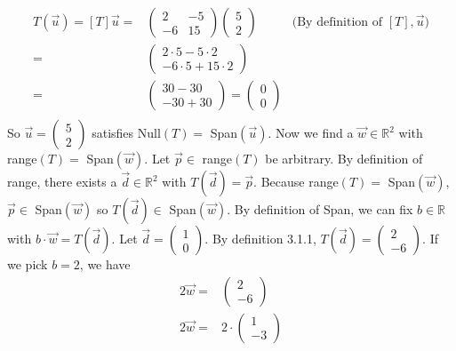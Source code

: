 \documentclass[12pt]{article}
\newenvironment{problem}[2][Problem]
{
	\begin{trivlist} 
		\item[\hskip \labelsep {\bfseries #1 #2:}]
	}
{
	\end{trivlist}
	}
\newenvironment{solution}[1][Solution]
{
	\begin{trivlist} 
		\item[\hskip \labelsep {\itshape #1:}]
	}
	{
	\end{trivlist}
}
\begin{document}
\begin{problem}{1}
\begin{solution}
\begin{align*}
T(\vec{u})=[T]\vec{u}=&\begin{pmatrix}2 &-5\\-6 & 15 \end{pmatrix}\begin{pmatrix}5\\2 \end{pmatrix} & \text{(By definition of $[T], \vec{u}$)}\\
=& \begin{pmatrix} 2\cdot 5-5\cdot 2\\-6\cdot 5+15\cdot 2 \end{pmatrix} &\\
=& \begin{pmatrix}30-30\\-30 + 30\end{pmatrix} = \begin{pmatrix} 0\\0 \end{pmatrix} &\\
\end{align*}
So $\vec{u}=\begin{pmatrix} 5\\2 \end{pmatrix}$ satisfies Null$(T)=$ Span$(\vec{u})$.
\newline
\newline
Now we find a $\vec{w} \in \mathbb{R}^2$ with range$(T)=$ Span$(\vec{w})$. Let $\vec{p} \in$ range$(T)$ be arbitrary. By definition of range, there exists a $\vec{d} \in \mathbb{R}^2$ with $T(\vec{d}) =\vec{p}$. Because range$(T)=$ Span$(\vec{w})$, $\vec{p} \in$ Span$(\vec{w})$ so $T(\vec{d})\in$ Span$(\vec{w})$. By definition of Span, we can fix $b \in \mathbb{R}$ with $b\cdot \vec{w}=T(\vec{d})$. Let $\vec{d}=\begin{pmatrix} 1\\0 \end{pmatrix}$. By definition 3.1.1, $T(\vec{d})=\begin{pmatrix} 2\\-6 \end{pmatrix}$. If we pick $b=2$, we have 
\begin{align*}
2\vec{w}=&\begin{pmatrix} 2\\-6 \end{pmatrix}\\
2\vec{w}=&2\cdot \begin{pmatrix} 1\\-3 \end{pmatrix}\\

\end{align*}
\end{solution}
\end{problem}
\end{document}
